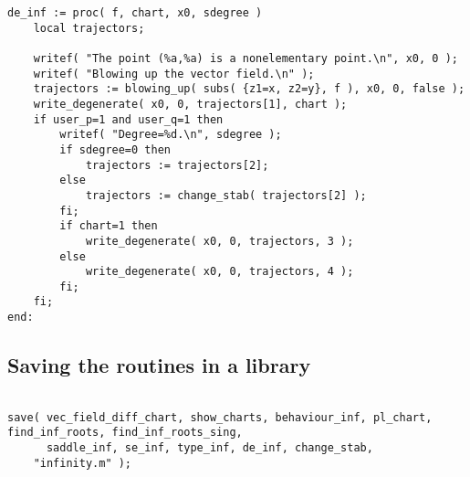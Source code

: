 \documentclass[a4paper,10pt]{article}
\begin{document}
\begin{lstlisting}[name=infinity]
de_inf := proc( f, chart, x0, sdegree )
    local trajectors;

    writef( "The point (%a,%a) is a nonelementary point.\n", x0, 0 );
    writef( "Blowing up the vector field.\n" );
    trajectors := blowing_up( subs( {z1=x, z2=y}, f ), x0, 0, false );
    write_degenerate( x0, 0, trajectors[1], chart );
    if user_p=1 and user_q=1 then
        writef( "Degree=%d.\n", sdegree );
        if sdegree=0 then
            trajectors := trajectors[2];
        else
            trajectors := change_stab( trajectors[2] );
        fi;
        if chart=1 then
            write_degenerate( x0, 0, trajectors, 3 );
        else
            write_degenerate( x0, 0, trajectors, 4 );
        fi;
    fi;
end:

\end{lstlisting}

\subsection{Saving the routines in a library}

\begin{lstlisting}[name=infinity]

save( vec_field_diff_chart, show_charts, behaviour_inf, pl_chart, find_inf_roots, find_inf_roots_sing,
      saddle_inf, se_inf, type_inf, de_inf, change_stab,
    "infinity.m" );
\end{lstlisting}
\end{document}
